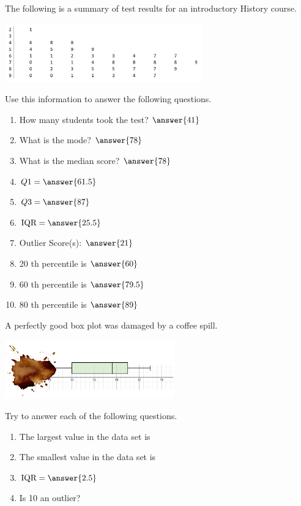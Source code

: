\documentclass{ximera}
\begin{document}
\begin{problem}\label{prob:140hom2prob4}
The following is a summary of test results for an introductory History course.
\begin{image}
   \includegraphics[height=1in]{140H2pic1.jpg}
 \end{image}
 
 Use this information to answer the following questions.
 
 \begin{enumerate}
     \item How many students took the test? $\answer{41}$
     \item What is the mode? $\answer{78}$
     \item What is the median score? $\answer{78}$
     \item $Q1=\answer{61.5}$
     \item $Q3=\answer{87}$
     \item $\mbox{IQR}=\answer{25.5}$
     \item Outlier Score(s): $\answer{21}$
     \item 20 th percentile is $\answer{60}$
     \item 60 th percentile is $\answer{79.5}$
     \item 80 th percentile is $\answer{89}$
 \end{enumerate}
\end{problem}

\begin{problem}\label{prob:140hom2prob5}
A perfectly good box plot was damaged by a coffee spill.  
\begin{image}
   \includegraphics[height=1in]{140H2pic9.jpg}
 \end{image}
 Try to answer each of the following questions.
 \begin{enumerate}
     \item The largest value in the data set is 
     \item The smallest value in the data set is 
     \item $\mbox{IQR}=\answer{2.5}$
     \item Is 10 an outlier? 
 \end{enumerate}
 
 \end{problem}
\end{document}

